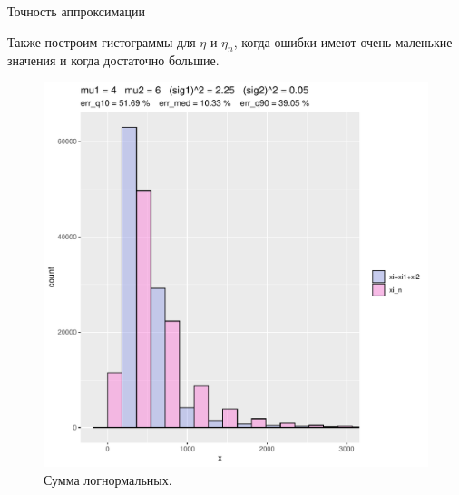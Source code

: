 \documentclass[ucs, notheorems, handout]{beamer}
\begin{document}
\begin{frame}{Точность аппроксимации }
	
	Также построим гистограммы для $\eta$ и $\eta_{n}$, когда ошибки имеют очень маленькие значения и когда достаточно большие.
	
	\begin{figure}[h]
		\begin{center}
			\begin{minipage}[h]{0.7\linewidth}
				\includegraphics[width=1\linewidth]{hist_new_1.pdf}
				\caption{Сумма логнормальных.} %
				\label{ris7} %
			\end{minipage}
			
		\end{center}
	\end{figure}	
	
\end{frame}
\end{document}
